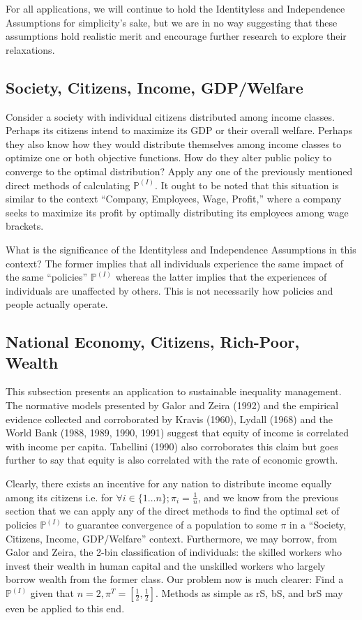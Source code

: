 \documentclass{article}
\begin{document}
For all applications, we will continue to hold the Identityless and Independence Assumptions for simplicity's sake, but we are in no way suggesting that these assumptions hold realistic merit and encourage further research to explore their relaxations.

\subsection{Society, Citizens, Income, GDP/Welfare}
Consider a society with individual citizens distributed among income classes. Perhaps its citizens intend to maximize its GDP or their overall welfare. Perhaps they also know how they would distribute themselves among income classes to optimize one or both objective functions. How do they alter public policy to converge to the optimal distribution? Apply any one of the previously mentioned direct methods of calculating $\mathbb{P}^{(I)}$. It ought to be noted that this situation is similar to the context ``Company, Employees, Wage, Profit,'' where a company seeks to maximize its profit by optimally distributing its employees among wage brackets.

What is the significance of the Identityless and Independence Assumptions in this context? The former implies that all individuals experience the same impact of the same ``policies'' $\mathbb{P}^{(I)}$ whereas the latter implies that the experiences of individuals are unaffected by others. This is not necessarily how policies and people actually operate.

\subsection{National Economy, Citizens, Rich-Poor, Wealth}
This subsection presents an application to sustainable inequality management. The normative models presented by Galor and Zeira (1992) and the empirical evidence collected and corroborated by Kravis (1960), Lydall (1968) and the World Bank (1988, 1989, 1990, 1991) suggest that equity of income is correlated with income per capita. Tabellini (1990) also corroborates this claim but goes further to say that equity is also correlated with the rate of economic growth. \cite{GalorZeira}

Clearly, there exists an incentive for any nation to distribute income equally among its citizens i.e. for $\forall i \in \{1 \dots n\}; \pi_i = \frac{1}{n}$, and we know from the previous section that we can apply any of the direct methods to find the optimal set of policies $\mathbb{P}^{(I)}$ to guarantee convergence of a population to some $\pi$ in a ``Society, Citizens, Income, GDP/Welfare'' context. Furthermore, we may borrow, from Galor and Zeira, the 2-bin classification of individuals: the skilled workers who invest their wealth in human capital and the unskilled workers who largely borrow wealth from the former class. Our problem now is much clearer: Find a $\mathbb{P}^{(I)}$ given that $n=2, \pi^T = [\frac{1}{2}, \frac{1}{2}]$. Methods as simple as rS, bS, and brS may even be applied to this end.
\end{document}
